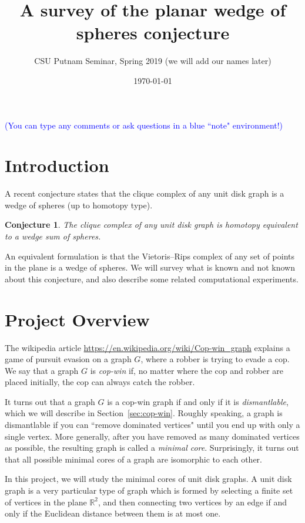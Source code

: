 \documentclass[amscd, amssymb, verbatim]{amsart}[12pt]
\newcommand{\note}[1]{\textcolor{blue}{({#1})}}
\theoremstyle{plain}
\newtheorem{conjecture}[lemma]{Conjecture}
\theoremstyle{definition}
\newcommand{\R}{\mathbb{R}}
\begin{document}
\title{
A survey of the planar wedge of spheres conjecture
}
\author{CSU Putnam Seminar, Spring 2019 (we will add our names later)}
\date{\today}
\maketitle

\note{You can type any comments or ask questions in a blue ``note" environment!}

\section{Introduction}

A recent conjecture states that the clique complex of any unit disk graph is a wedge of spheres (up to homotopy type).
\begin{conjecture}\label{conj:main}
The clique complex of any unit disk graph is homotopy equivalent to a wedge sum of spheres.
\end{conjecture}
An equivalent formulation is that the Vietoris--Rips complex of any set of points in the plane is a wedge of spheres.
We will survey what is known and not known about this conjecture, and also describe some related computational experiments.


\section{Project Overview}

The wikipedia article \url{https://en.wikipedia.org/wiki/Cop-win\_graph} explains a game of pursuit evasion on a graph $G$, where a robber is trying to evade a cop. 
We say that a graph $G$ is \emph{cop-win} if, no matter where the cop and robber are placed initially, the cop can always catch the robber.

It turns out that a graph $G$ is a cop-win graph if and only if it is \emph{dismantlable}, which we will describe in Section~\ref{sec:cop-win}.
Roughly speaking, a graph is dismantlable if you can ``remove dominated vertices" until you end up with only a single vertex.
More generally, after you have removed as many dominated vertices as possible, the resulting graph is called a \emph{minimal core}. Surprisingly, it turns out that all possible minimal cores of a graph are isomorphic to each other.

In this project, we will study the minimal cores of unit disk graphs.
A unit disk graph is a very particular type of graph which is formed by selecting a finite set of vertices in the plane $\R^2$, and then connecting two vertices by an edge if and only if the Euclidean distance between them is at most one.
\end{document}

